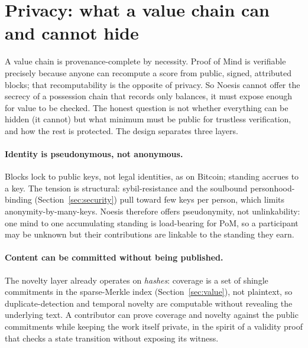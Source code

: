 \documentclass[10pt]{article}
\begin{document}
\section{Privacy: what a value chain can and cannot hide}\label{sec:privacy}

A value chain is provenance-complete by necessity. Proof of Mind is verifiable precisely because anyone
can recompute a score from public, signed, attributed blocks; that recomputability is the opposite of
privacy. So Noesis cannot offer the secrecy of a possession chain that records only balances, it must
expose enough for value to be checked. The honest question is not whether everything can be hidden (it
cannot) but what minimum must be public for trustless verification, and how the rest is protected.
The design separates three layers.

\paragraph{Identity is pseudonymous, not anonymous.} Blocks lock to public keys, not legal identities,
as on Bitcoin; standing accrues to a key. The tension is structural: sybil-resistance and the soulbound
personhood-binding (Section~\ref{sec:security}) pull toward few keys per person, which limits
anonymity-by-many-keys. Noesis therefore offers pseudonymity, not unlinkability: one mind to one
accumulating standing is load-bearing for PoM, so a participant may be unknown but their contributions
are linkable to the standing they earn.

\paragraph{Content can be committed without being published.} The novelty layer already operates on
\emph{hashes}: coverage is a set of shingle commitments in the sparse-Merkle index
(Section~\ref{sec:value}), not plaintext, so duplicate-detection and temporal novelty are computable
without revealing the underlying text. A contributor can prove coverage and novelty against the public
commitments while keeping the work itself private, in the spirit of a validity proof that checks a state
transition without exposing its witness.
\end{document}
